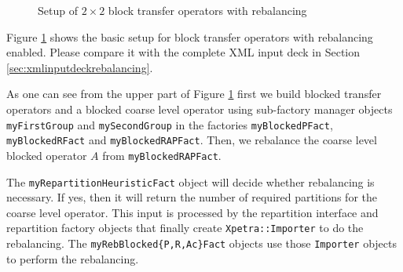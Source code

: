 \documentclass[10pt,fleqn]{book}
\begin{document}
\begin{figure}
\caption{Setup of $2\times 2$ block transfer operators with rebalancing}
\label{fig:transferoperatorsetuprebalancing}
\end{figure}

Figure \ref{fig:transferoperatorsetuprebalancing} shows the basic setup for block transfer operators with rebalancing enabled. Please compare it with the complete XML input deck in Section \ref{sec:xmlinputdeckrebalancing}.

As one can see from the upper part of Figure \ref{fig:transferoperatorsetuprebalancing} first we build blocked transfer operators and a blocked coarse level operator using sub-factory manager objects \texttt{myFirstGroup} and \texttt{mySecondGroup} in the factories \texttt{myBlockedPFact}, \texttt{myBlockedRFact} and \texttt{myBlockedRAPFact}. Then, we rebalance the coarse level blocked operator $A$ from \texttt{myBlockedRAPFact}. 

The \texttt{myRepartitionHeuristicFact} object will decide whether rebalancing is necessary. If yes, then it will return the number of required partitions for the coarse level operator. This input is processed by the repartition interface and repartition factory objects that finally create \texttt{Xpetra::Importer} to do the rebalancing. The \texttt{myRebBlocked\{P,R,Ac\}Fact} objects use those \texttt{Importer} objects to perform the rebalancing.
\end{document}
